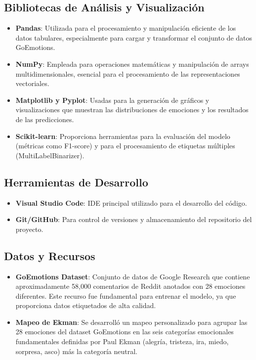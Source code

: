 \documentclass[12pt,a4paper]{report}
\begin{document}
\subsection{Bibliotecas de Análisis y Visualización}

\begin{itemize}
  \item \textbf{Pandas}: Utilizada para el procesamiento y manipulación eficiente de los datos tabulares, especialmente para cargar y transformar el conjunto de datos GoEmotions.

  \item \textbf{NumPy}: Empleada para operaciones matemáticas y manipulación de arrays multidimensionales, esencial para el procesamiento de las representaciones vectoriales.

  \item \textbf{Matplotlib y Pyplot}: Usadas para la generación de gráficos y visualizaciones que muestran las distribuciones de emociones y los resultados de las predicciones.

  \item \textbf{Scikit-learn}: Proporciona herramientas para la evaluación del modelo (métricas como F1-score) y para el procesamiento de etiquetas múltiples (MultiLabelBinarizer).
\end{itemize}

\subsection{Herramientas de Desarrollo}

\begin{itemize}
  \item \textbf{Visual Studio Code}: IDE principal utilizado para el desarrollo del código.

  \item \textbf{Git/GitHub}: Para control de versiones y almacenamiento del repositorio del proyecto.
\end{itemize}

\subsection{Datos y Recursos}

\begin{itemize}
  \item \textbf{GoEmotions Dataset}: Conjunto de datos de Google Research que contiene aproximadamente 58,000 comentarios de Reddit anotados con 28 emociones diferentes. Este recurso fue fundamental para entrenar el modelo, ya que proporciona datos etiquetados de alta calidad.

  \item \textbf{Mapeo de Ekman}: Se desarrolló un mapeo personalizado para agrupar las 28 emociones del dataset GoEmotions en las seis categorías emocionales fundamentales definidas por Paul Ekman (alegría, tristeza, ira, miedo, sorpresa, asco) más la categoría neutral.
\end{itemize}
\end{document}

